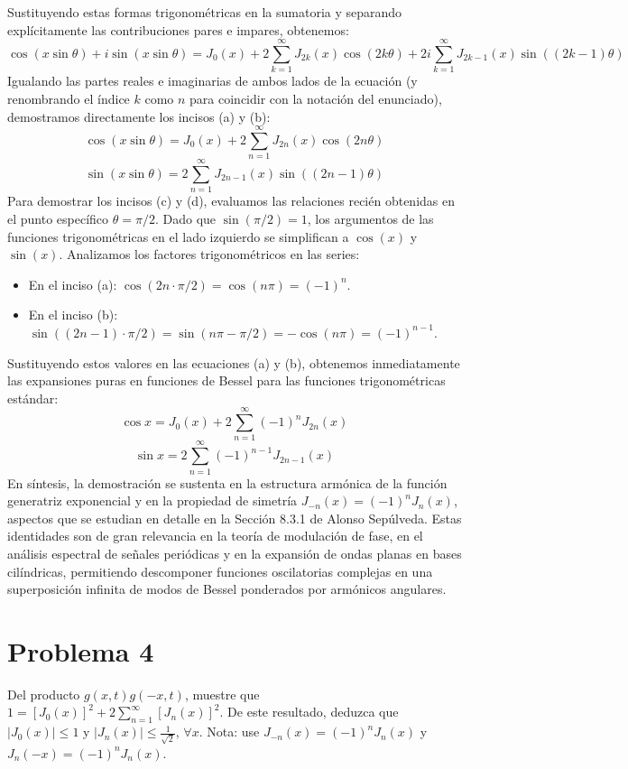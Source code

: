 \documentclass[a4paper]{article}
\begin{document}
Sustituyendo estas formas trigonométricas en la sumatoria y separando explícitamente las contribuciones pares e impares, obtenemos:
$$\cos(x\sin\theta) + i\sin(x\sin\theta) = J_0(x) + 2\sum_{k=1}^{\infty} J_{2k}(x)\cos(2k\theta) + 2i\sum_{k=1}^{\infty} J_{2k-1}(x)\sin((2k-1)\theta)$$
Igualando las partes reales e imaginarias de ambos lados de la ecuación (y renombrando el índice $k$ como $n$ para coincidir con la notación del enunciado), demostramos directamente los incisos (a) y (b):
$$\cos(x\sin\theta) = J_0(x) + 2\sum_{n=1}^{\infty} J_{2n}(x)\cos(2n\theta)$$
$$\sin(x\sin\theta) = 2\sum_{n=1}^{\infty} J_{2n-1}(x)\sin((2n-1)\theta)$$
Para demostrar los incisos (c) y (d), evaluamos las relaciones recién obtenidas en el punto específico $\theta = \pi/2$. Dado que $\sin(\pi/2) = 1$, los argumentos de las funciones trigonométricas en el lado izquierdo se simplifican a $\cos(x)$ y $\sin(x)$. Analizamos los factores trigonométricos en las series:
\begin{itemize}
\item En el inciso (a): $\cos(2n \cdot \pi/2) = \cos(n\pi) = (-1)^n$.
\item En el inciso (b): $\sin((2n-1) \cdot \pi/2) = \sin(n\pi - \pi/2) = -\cos(n\pi) = (-1)^{n-1}$.
\end{itemize}
Sustituyendo estos valores en las ecuaciones (a) y (b), obtenemos inmediatamente las expansiones puras en funciones de Bessel para las funciones trigonométricas estándar:
$$\cos x = J_0(x) + 2\sum_{n=1}^{\infty} (-1)^n J_{2n}(x)$$
$$\sin x = 2\sum_{n=1}^{\infty} (-1)^{n-1} J_{2n-1}(x)$$
En síntesis, la demostración se sustenta en la estructura armónica de la función generatriz exponencial y en la propiedad de simetría $J_{-n}(x)=(-1)^nJ_n(x)$, aspectos que se estudian en detalle en la Sección 8.3.1 de Alonso Sepúlveda. Estas identidades son de gran relevancia en la teoría de modulación de fase, en el análisis espectral de señales periódicas y en la expansión de ondas planas en bases cilíndricas, permitiendo descomponer funciones oscilatorias complejas en una superposición infinita de modos de Bessel ponderados por armónicos angulares.



\section{Problema 4}
Del producto $g(x, t)g(-x, t)$, muestre que $1=[J_0(x)]^2+2\sum_{n=1}^{\infty}[J_n(x)]^2$. De este resultado, deduzca que $|J_0(x)| \le 1$ y $|J_n(x)| \le \frac{1}{\sqrt{2}}$, $\forall x$. Nota: use $J_{-n}(x)=(-1)^nJ_n(x)$ y $J_n(-x)=(-1)^nJ_n(x)$.
\end{document}
